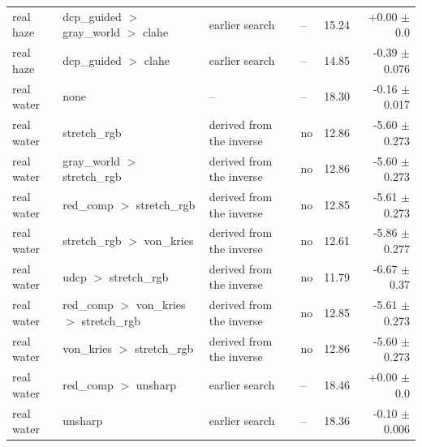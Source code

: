 \begin{longtable}{llllrr}
real haze & dcp\_guided $>$ gray\_world $>$ clahe & earlier search & -- & 15.24 & +0.00 $\pm$ 0.0 \\
real haze & dcp\_guided $>$ clahe & earlier search & -- & 14.85 & -0.39 $\pm$ 0.076 \\
real water & none & -- & -- & 18.30 & -0.16 $\pm$ 0.017 \\
real water & stretch\_rgb & derived from the inverse & no & 12.86 & -5.60 $\pm$ 0.273 \\
real water & gray\_world $>$ stretch\_rgb & derived from the inverse & no & 12.86 & -5.60 $\pm$ 0.273 \\
real water & red\_comp $>$ stretch\_rgb & derived from the inverse & no & 12.85 & -5.61 $\pm$ 0.273 \\
real water & stretch\_rgb $>$ von\_kries & derived from the inverse & no & 12.61 & -5.86 $\pm$ 0.277 \\
real water & udcp $>$ stretch\_rgb & derived from the inverse & no & 11.79 & -6.67 $\pm$ 0.37 \\
real water & red\_comp $>$ von\_kries $>$ stretch\_rgb & derived from the inverse & no & 12.85 & -5.61 $\pm$ 0.273 \\
real water & von\_kries $>$ stretch\_rgb & derived from the inverse & no & 12.86 & -5.60 $\pm$ 0.273 \\
real water & red\_comp $>$ unsharp & earlier search & -- & 18.46 & +0.00 $\pm$ 0.0 \\
real water & unsharp & earlier search & -- & 18.36 & -0.10 $\pm$ 0.006 \\
\bottomrule
\end{longtable}

